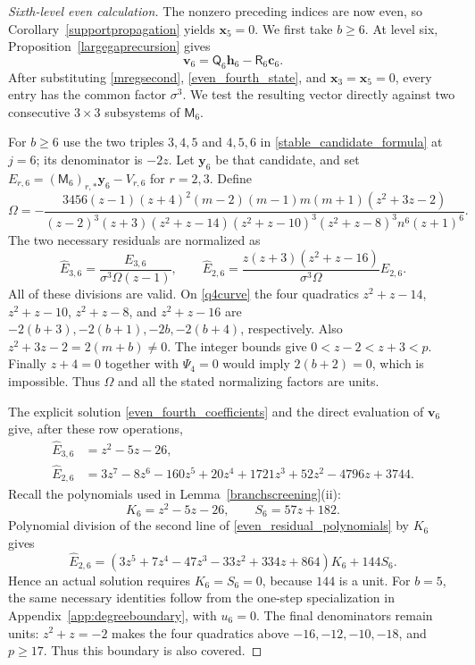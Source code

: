 \documentclass[12pt]{article}
\theoremstyle{remark}
\begin{document}
\begin{proof}[Sixth-level even calculation]
The nonzero preceding indices are now even, so
Corollary~\ref{supportpropagation} yields $\mathbf x_5=0$.
We first take $b\ge6$.  At level six,
Proposition~\ref{largegaprecursion} gives
\[
 \mathbf v_6=\mathsf Q_6\mathbf h_6-\mathsf R_6\mathbf c_6.
\]
After substituting \eqref{mregsecond}, \eqref{even_fourth_state}, and
$\mathbf x_3=\mathbf x_5=0$, every entry has the common factor
$\sigma^3$.  We test the resulting vector directly against two
consecutive $3\times3$ subsystems of $\mathsf M_6$.

For $b\ge6$ use the two triples $3,4,5$ and $4,5,6$ in
\eqref{stable_candidate_formula} at $j=6$; its denominator is $-2z$.
Let $\mathbf y_6$ be that candidate, and set
$E_{r,6}=(\mathsf M_6)_{r,*}\mathbf y_6-V_{r,6}$ for $r=2,3$.
Define
\begin{equation*}
 \Omega=-\frac{3456(z-1)(z+4)^2(m-2)(m-1)m(m+1)(z^2+3z-2)}
 {(z-2)^3(z+3)(z^2+z-14)(z^2+z-10)^3
                    (z^2+z-8)^3n^6(z+1)^6}.
\end{equation*}
The two necessary residuals are normalized as
\[
 \widehat E_{3,6}=\frac{E_{3,6}}{\sigma^3\Omega(z-1)},\qquad
 \widehat E_{2,6}=\frac{z(z+3)(z^2+z-16)}{\sigma^3\Omega}E_{2,6}.
\]
All of these divisions are valid.  On \eqref{q4curve} the four
quadratics $z^2+z-14$, $z^2+z-10$, $z^2+z-8$, and $z^2+z-16$
are $-2(b+3),-2(b+1),-2b,-2(b+4)$, respectively.
Also $z^2+3z-2=2(m+b)\ne0$.
The integer bounds give $0<z-2<z+3<p$.  Finally $z+4=0$ together
with $\Psi_4=0$ would imply $2(b+2)=0$, which is impossible.
Thus $\Omega$ and all the stated normalizing factors are units.

The explicit solution \eqref{even_fourth_coefficients} and the direct
evaluation of $\mathbf v_6$ give, after these row operations,
\begin{equation}\label{even_residual_polynomials}
\begin{aligned}
 \widehat E_{3,6}&=z^2-5z-26,\\
 \widehat E_{2,6}&=3z^7-8z^6-160z^5+20z^4+1721z^3
                           +52z^2-4796z+3744.
\end{aligned}
\end{equation}
Recall the polynomials used in Lemma~\ref{branchscreening}(ii):
\begin{equation}\label{vsixthres}
 K_6=z^2-5z-26,\qquad S_6=57z+182.
\end{equation}
Polynomial division of the second line of
\eqref{even_residual_polynomials} by $K_6$ gives
\[
 \widehat E_{2,6}=(3z^5+7z^4-47z^3-33z^2+334z+864)K_6+144S_6.
\]
Hence an actual solution requires $K_6=S_6=0$, because $144$ is a unit.
For $b=5$, the same necessary identities follow from the one-step
specialization in Appendix~\ref{app:degreeboundary}, with $u_6=0$.  The final denominators
remain units: $z^2+z=-2$ makes the four quadratics above
$-16,-12,-10,-18$, and $p\ge17$.  Thus this boundary is also covered.


\end{proof}
\end{document}
